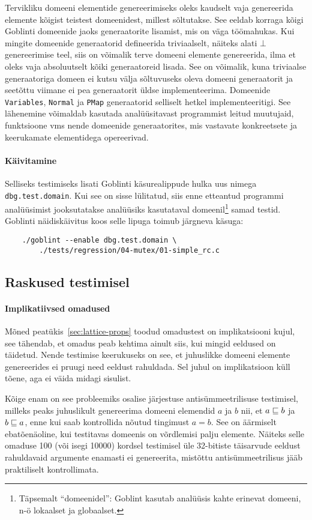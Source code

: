 \documentclass[../thesis.tex]{subfiles}
\begin{document}
Tervikliku domeeni elementide genereerimiseks oleks kaudselt vaja genereerida elemente kõigist teistest domeenidest, millest sõltutakse. See eeldab korraga kõigi Goblinti domeenide jaoks generaatorite lisamist, mis on väga töömahukas. Kui mingite domeenide generaatorid defineerida triviaalselt, näiteks alati $\bot$ genereerimise teel, siis on võimalik terve domeeni elemente genereerida, ilma et oleks vaja absoluutselt kõiki generaatoreid lisada. See on võimalik, kuna triviaalse generaatoriga domeen ei kutsu välja sõltuvuseks oleva domeeni generaatorit ja seetõttu viimane ei pea generaatorit üldse implementeerima. Domeenide \texttt{Variables}, \texttt{Normal} ja \texttt{PMap} generaatorid selliselt hetkel implementeeritigi.
See lähenemine võimaldab kasutada analüüsitavast programmist leitud muutujaid, funktsioone vms nende domeenide generaatorites, mis vastavate konkreetsete ja keerukamate elementidega opereerivad.

\paragraph{Käivitamine}
Selliseks testimiseks lisati Goblinti käsurealippude hulka uus nimega \texttt{dbg.test.domain}. Kui see on sisse lülitatud, siis enne etteantud programmi analüüsimist jooksutatakse analüüsiks kasutataval domeenil\footnote{Täpsemalt \enquote{domeenidel}: Goblint kasutab analüüsis kahte erinevat domeeni, n-ö lokaalset ja globaalset.} samad testid. Goblinti näidiskäivitus koos selle lipuga toimub järgneva käsuga:
\begin{verbatim}
	./goblint --enable dbg.test.domain \
	    ./tests/regression/04-mutex/01-simple_rc.c
\end{verbatim}

\subsection{Raskused testimisel}
\paragraph{Implikatiivsed omadused}
Mõned peatükis~\ref{sec:lattice-props} toodud omadustest on implikatsiooni kujul, see tähendab, et omadus peab kehtima ainult siis, kui mingid eeldused on täidetud. Nende testimise keerukuseks on see, et juhuslikke domeeni elemente genereerides ei pruugi need eeldust rahuldada. Sel juhul on implikatsioon küll tõene, aga ei väida midagi sisulist.

Kõige enam on see probleemiks osalise järjestuse antisümmeetrilisuse testimisel, milleks peaks juhuslikult genereerima domeeni elemendid $a$ ja $b$ nii, et $a \sqsubseteq b$ ja $b \sqsubseteq a$, enne kui saab kontrollida nõutud tingimust $a = b$. See on äärmiselt ebatõenäoline, kui testitavas domeenis on võrdlemisi palju elemente. Näiteks selle omaduse 100 (või isegi 10000) kordsel testimisel üle 32-bitiste täisarvude eeldust rahuldavaid argumente enamasti ei genereerita, mistõttu antisümmeetrilisus jääb praktiliselt kontrollimata.
\end{document}
